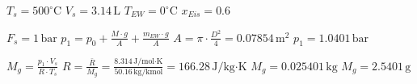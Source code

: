 \( T_s = 500^\circ \text{C} \)  
\( V_s = 3.14 \, \text{L} \)  
\( T_{EW} = 0^\circ \text{C} \)  
\( x_{Eis} = 0.6 \)  

\( F_s = 1 \, \text{bar} \)  
\( p_1 = p_0 + \frac{M \cdot g}{A} + \frac{m_{EW} \cdot g}{A} \)  
\( A = \pi \cdot \frac{D^2}{4} = 0.07854 \, \text{m}^2 \)  
\( p_1 = 1.0401 \, \text{bar} \)  

\( M_g = \frac{p_1 \cdot V_s}{R \cdot T_s} \)  
\( R = \frac{\bar{R}}{M_g} = \frac{8.314 \, \text{J/mol·K}}{50.16 \, \text{kg/kmol}} = 166.28 \, \text{J/kg·K} \)  
\( M_g = 0.025401 \, \text{kg} \)  
\( M_g = 2.5401 \, \text{g} \)